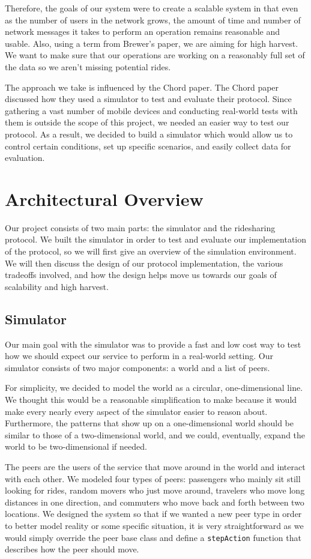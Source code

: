 \documentclass[letterpaper,11pt,twocolumn]{article}
\begin{document}
Therefore, the goals of our system were to create a scalable system in that even as the 
number of users in the network grows, the amount of time and number of network messages it takes to perform an operation remains reasonable and usable. Also, using a term from Brewer's paper, we are aiming for high harvest. We want to make sure that our operations are working on a reasonably full set of the data so we aren't missing potential rides. 

The approach we take is influenced by the Chord paper. The Chord paper discussed how they used a simulator to test and evaluate their protocol. Since gathering a vast number of mobile devices and conducting real-world tests with them is outside the scope of this project, we needed an easier way to test our protocol. As a result, we decided to build a simulator which would allow us to control certain conditions, set up specific scenarios, and easily collect data for evaluation. 

\section{Architectural Overview}
Our project consists of two main parts: the simulator and the ridesharing protocol. We built the simulator in order to test and evaluate our implementation of the protocol, so we will first give an overview of the simulation environment. We will then discuss the design of our protocol implementation, the various tradeoffs involved, and how the design helps move us towards our goals of scalability and high harvest.

\subsection{Simulator}
Our main goal with the simulator was to provide a fast and low cost way to test how we should expect our service to perform in a real-world setting. Our simulator consists of two major components: a world and a list of peers.

For simplicity, we decided to model the world as a circular, one-dimensional line. We thought this would be a reasonable simplification to make because it would make every nearly every aspect of the simulator easier to reason about. Furthermore, the patterns that show up on a one-dimensional world should be similar to those of a two-dimensional world, and we could, eventually, expand the world to be two-dimensional if needed.

The peers are the users of the service that move around in the world and interact with each other. We modeled four types of peers: passengers who mainly sit still looking for rides, random movers who just move around, travelers who move long distances in one direction, and commuters who move back and forth between two locations. We designed the system so that if we wanted a new peer type in order to better model reality or some specific situation, it is very straightforward as we would simply override the peer base class and define a \texttt{stepAction} function that describes how the peer should move.
\end{document}
